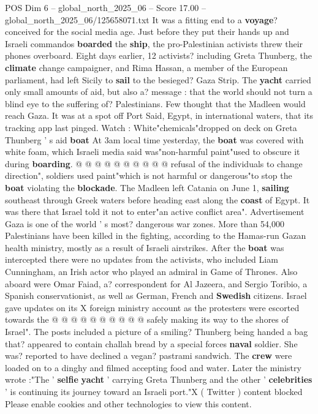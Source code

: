 \begin{textsample}{POS Dim 6 – global\_north\_2025\_06 – Score 17.00 – global\_north\_2025\_06/125658071.txt}  \label{ex:f6_pos_029}
It was a fitting end to a \textbf{voyage}? conceived for the social media age.
Just before they put their hands up and Israeli commandos \textbf{boarded} the \textbf{ship}, the pro-Palestinian activists threw their phones overboard.
Eight days earlier, 12 activists? including Greta Thunberg, the \textbf{climate} change campaigner, and Rima Hassan, a member of the European parliament, had left Sicily to \textbf{sail} to the besieged?
Gaza Strip.
The \textbf{yacht} carried only small amounts of aid, but also a? message : that the world should not turn a blind eye to the suffering of?
Palestinians.
Few thought that the Madleen would reach Gaza.
It was at a spot off Port Said, Egypt, in international waters, that its tracking app last pinged.
Watch : White"chemicals"dropped on deck on Greta Thunberg ' s aid \textbf{boat} At 3am local time yesterday, the \textbf{boat} was covered with white foam, which Israeli media said was"non-harmful paint"used to obscure it during \textbf{boarding}. @ @ @ @ @ @ @ @ @ @ refusal of the individuals to change direction", soldiers used paint"which is not harmful or dangerous"to stop the \textbf{boat} violating the \textbf{blockade}.
The Madleen left Catania on June 1, \textbf{sailing} southeast through Greek waters before heading east along the \textbf{coast} of Egypt.
It was there that Israel told it not to enter"an active conflict area".
Advertisement Gaza is one of the world ' s most? dangerous war zones.
More than 54,000 Palestinians have been killed in the fighting, according to the Hamas-run Gazan health ministry, mostly as a result of Israeli airstrikes.
After the \textbf{boat} was intercepted there were no updates from the activists, who included Liam Cunningham, an Irish actor who played an admiral in Game of Thrones.
Also aboard were Omar Faiad, a? correspondent for Al Jazeera, and Sergio Toribio, a Spanish conservationist, as well as German, French and \textbf{Swedish} citizens.
Israel gave updates on its X foreign ministry account as the protesters were escorted towards the @ @ @ @ @ @ @ @ @ @ safely making its way to the shores of Israel".
The posts included a picture of a smiling?
Thunberg being handed a bag that? appeared to contain challah bread by a special forces \textbf{naval} soldier.
She was? reported to have declined a vegan? pastrami sandwich.
The \textbf{crew} were loaded on to a dinghy and filmed accepting food and water.
Later the ministry wrote :"The ' \textbf{selfie} \textbf{yacht} ' carrying Greta Thunberg and the other ' \textbf{celebrities} ' is continuing its journey toward an Israeli port."X ( Twitter ) content blocked Please enable cookies and other technologies to view this content.

\end{textsample}
